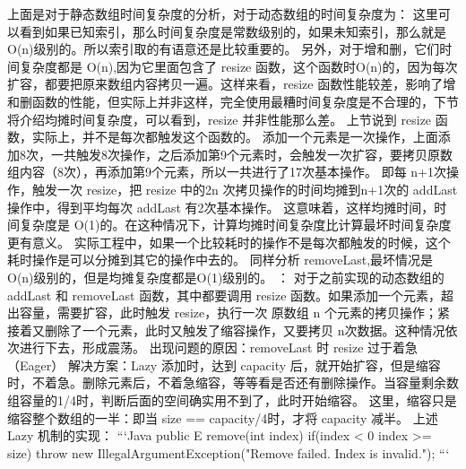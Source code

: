 {}上面是对于静态数组时间复杂度的分析，对于动态数组的时间复杂度为：  这里可以看到如果已知索引，那么时间复杂度是常数级别的，如果未知索引，那么就是 O(n)级别的。所以索引取的有语意还是比较重要的。 另外，对于增和删，它们时间复杂度都是 O(n),因为它里面包含了 resize 函数，这个函数时O(n)的，因为每次扩容，都要把原来数组内容拷贝一遍。这样来看，resize 函数性能较差，影响了增和删函数的性能，但实际上并非这样，完全使用最糟时间复杂度是不合理的，下节将介绍均摊时间复杂度，可以看到，resize 并非性能那么差。\markdownRendererInterblockSeparator
{}\markdownRendererInterblockSeparator
{}上节说到 resize 函数，实际上，并不是每次都触发这个函数的。  添加一个元素是一次操作，上面添加8次，一共触发8次操作，之后添加第9个元素时，会触发一次扩容，要拷贝原数组内容（8次），再添加第9个元素，所以一共进行了17次基本操作。\markdownRendererInterblockSeparator
{} 即每 n+1次操作，触发一次 resize，把 resize 中的2n 次拷贝操作的时间均摊到n+1次的 addLast 操作中，得到平均每次 addLast 有2次基本操作。 这意味着，这样均摊时间，时间复杂度是 O(1)的。在这种情况下，计算均摊时间复杂度比计算最坏时间复杂度更有意义。 实际工程中，如果一个比较耗时的操作不是每次都触发的时候，这个耗时操作是可以分摊到其它的操作中去的。 同样分析 removeLast,最坏情况是O(n)级别的，但是均摊复杂度都是O(1)级别的。\markdownRendererInterblockSeparator
{}： \markdownRendererInterblockSeparator
{}对于之前实现的动态数组的 addLast 和 removeLast 函数，其中都要调用 resize 函数。如果添加一个元素，超出容量，需要扩容，此时触发 resize，执行一次 原数组 n 个元素的拷贝操作；紧接着又删除了一个元素，此时又触发了缩容操作，又要拷贝 n次数据。这种情况依次进行下去，形成震荡。 出现问题的原因：removeLast 时 resize 过于着急（Eager） 解决方案：Lazy 添加时，达到 capacity 后，就开始扩容，但是缩容时，不着急。删除元素后，不着急缩容，等等看是否还有删除操作。当容量剩余数组容量的1/4时，判断后面的空间确实用不到了，此时开始缩容。  这里，缩容只是缩容整个数组的一半：即当 size == capacity/4时，才将 capacity 减半。 \markdownRendererInterblockSeparator
{}上述 Lazy 机制的实现： ```Java public E remove(int index)\markdownRendererLeftBrace{} if(index < 0 \markdownRendererPipe{}\markdownRendererPipe{} index >= size)\markdownRendererLeftBrace{} throw new IllegalArgumentException("Remove failed. Index is invalid.");\markdownRendererLineBreak
{}\markdownRendererRightBrace{}\markdownRendererInterblockSeparator
{}\markdownRendererInterblockSeparator
{}\markdownRendererRightBrace{}\markdownRendererInterblockSeparator
{}```\relax